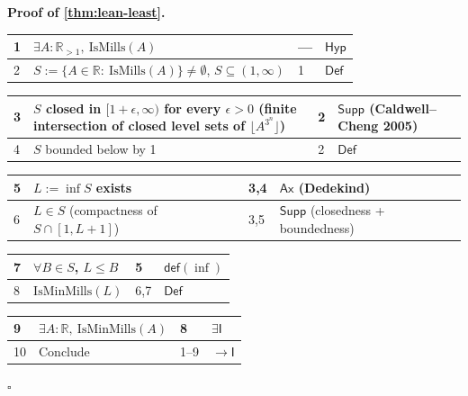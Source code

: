 \documentclass[11pt,reqno]{amsart}
\theoremstyle{blueplain}
\renewcommand{\qedsymbol}{\textcolor{proofqed}{\ensuremath{\square}}}
\renewenvironment{proof}[1][Proof]{\par\noindent\textbf{\textcolor{proofhead}{#1.}}\par\nobreak}{\par\nobreak\hfill\qedsymbol}
\numberwithin{equation}{section}
\begin{document}
\begin{proof}[\textbf{Proof of \cref{thm:lean-least}}]
\label{proof:lean-least}
{\scriptsize
\begin{tabular}{|m{0.7cm}|m{12cm}|m{1.4cm}|m{2.5cm}|}
\hline
1 & $\exists A:\mathbb{R}_{>1},\ \mathrm{IsMills}(A)$ & --- & $\mathsf{Hyp}$ \\ \hline
2 & $S:=\{A\in\mathbb{R}:\ \mathrm{IsMills}(A)\}\ne\emptyset$, $S\subseteq(1,\infty)$ & 1 & $\mathsf{Def}$ \\
\end{tabular}%
\noindent \newline
\noindent
\begin{tabular}{|m{0.7cm}|m{12cm}|m{1.4cm}|m{2.5cm}|}
\hline
3 & $S$ closed in $[1+\epsilon,\infty)$ for every $\epsilon>0$ (finite intersection of closed level sets of $\lfloor A^{3^n}\rfloor$) & 2 & $\mathsf{Supp}$ (Caldwell--Cheng 2005) \\ \hline
4 & $S$ bounded below by 1 & 2 & $\mathsf{Def}$ \\
\end{tabular}%
\noindent \newline
\noindent
\begin{tabular}{|m{0.7cm}|m{12cm}|m{1.4cm}|m{2.5cm}|}
\hline
5 & $L:=\inf S$ exists & 3,4 & $\mathsf{Ax}$ (Dedekind) \\ \hline
6 & $L\in S$ (compactness of $S\cap[1,L+1]$) & 3,5 & $\mathsf{Supp}$ (closedness + boundedness) \\
\end{tabular}%
\noindent \newline
\noindent
\begin{tabular}{|m{0.7cm}|m{12cm}|m{1.4cm}|m{2.5cm}|}
\hline
7 & $\forall B\in S$, $L\le B$ & 5 & $\mathsf{def}(\inf)$ \\ \hline
8 & $\mathrm{IsMinMills}(L)$ & 6,7 & $\mathsf{Def}$ \\
\end{tabular}%
\noindent \newline
\noindent
\begin{tabular}{|m{0.7cm}|m{12cm}|m{1.4cm}|m{2.5cm}|}
\hline
9 & $\exists A:\mathbb{R},\ \mathrm{IsMinMills}(A)$ & 8 & $\exists\mathsf{I}$ \\ \hline
10 & Conclude & 1--9 & $\rightarrow\mathsf{I}$ \\
\end{tabular}%
}
\end{proof}
\end{document}
